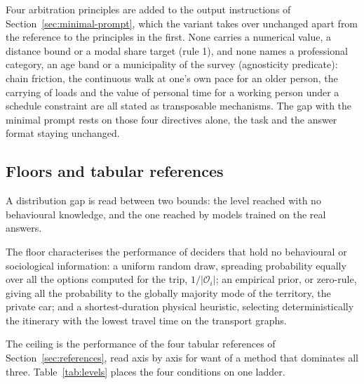 Four arbitration principles are added to the output instructions of Section~\ref{sec:minimal-prompt}, which the variant takes over unchanged apart from the reference to the principles in the first. None carries a numerical value, a distance bound or a modal share target (rule 1), and none names a professional category, an age band or a municipality of the survey (agnosticity predicate): chain friction, the continuous walk at one's own pace for an older person, the carrying of loads and the value of personal time for a working person under a schedule constraint are all stated as transposable mechanisms. The gap with the minimal prompt rests on those four directives alone, the task and the answer format staying unchanged.

\subsection{Floors and tabular references}
\label{sec:levels}

A distribution gap is read between two bounds: the level reached with no behavioural knowledge, and the one reached by models trained on the real answers.

The floor characterises the performance of deciders that hold no behavioural or sociological information: a uniform random draw, spreading probability equally over all the options computed for the trip, $1 / |\mathcal{O}_i|$; an empirical prior, or zero-rule, giving all the probability to the globally majority mode of the territory, the private car; and a shortest-duration physical heuristic, selecting deterministically the itinerary with the lowest travel time on the transport graphs.

The ceiling is the performance of the four tabular references of Section~\ref{sec:references}, read axis by axis for want of a method that dominates all three. Table~\ref{tab:levels} places the four conditions on one ladder.

